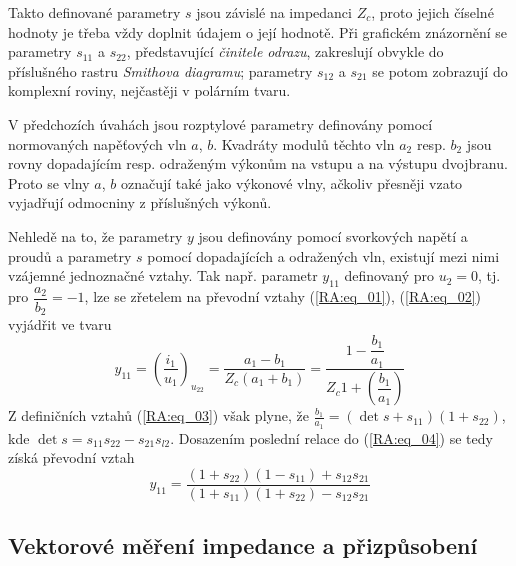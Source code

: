       Takto definované parametry \(s\) jsou závislé na impedanci \(Z_c\), proto jejich číselné 
      hodnoty je třeba vždy doplnit údajem o její hodnotě. Při grafickém znázornění se parametry 
      \(s_{11}\) a \(s_{22}\), představující \emph{činitele odrazu}, zakreslují obvykle do 
      příslušného rastru \emph{Smithova diagramu}; parametry \(s_{12}\) a \(s_{21}\) se potom 
      zobrazují do komplexní roviny, nejčastěji v polárním tvaru.
        
      V předchozích úvahách jsou rozptylové parametry definovány pomocí normovaných napěťových vln 
      \(a\), \(b\). Kvadráty modulů těchto vln \(a_2\) resp. \(b_2\) jsou rovny dopadajícím resp. 
      odraženým výkonům na vstupu a na výstupu dvojbranu. Proto se vlny \(a\), \(b\) označují také 
      jako výkonové vlny, ačkoliv přesněji vzato vyjadřují odmocniny z příslušných výkonů.
        
      Nehledě na to, že parametry \(y\) jsou definovány pomocí svorkových napětí a proudů a 
      parametry \(s\) pomocí dopadajících a odražených vln, existují mezi nimi vzájemné jednoznačné 
      vztahy. Tak např. parametr \(y_{11}\) definovaný pro \(u_2 = 0\), tj. pro 
      \(\dfrac{a_2}{b_2}=-1\), lze se zřetelem na převodní vztahy (\ref{RA:eq_01}), 
      (\ref{RA:eq_02}) vyjádřit ve tvaru
      \begin{equation}\label{RA:eq_04}
        y_{11} = \left(\frac{i_1}{u_1}\right)_{u_{22}} = \frac{a_1-b_1}{Z_c(a_1+b_1)} = 
                 \frac{1-\dfrac{b_1}{a_1}}{Z_c1+\left(\dfrac{b_1}{a_1}\right)} 
      \end{equation}
      Z definičních vztahů (\ref{RA:eq_03}) však plyne, že \(\frac{b_1}{a_1} = (\det s + s_{11})(1 
      + s_{22})\), kde \(\det s = s_{11}s_{22} -s_{21}s_{l2}\). Dosazením poslední relace do 
      (\ref{RA:eq_04}) se tedy získá převodní vztah
      \begin{equation}
        y_{11} = \frac{(1+s_{22})(1-s_{11})+s_{12}s_{21}}{(1+s_{11})(1+s_{22})-s_{12}s_{21}}
      \end{equation}
      
    \subsection{Vektorové měření impedance a přizpůsobení}
